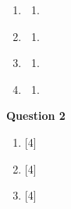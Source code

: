 \begin{enumerate}[label=(\roman*)]
    \item 

        \begin{multicols}{2}
        \begin{enumerate}[label=(\alph*)]
            \item 
        \end{enumerate}
        \end{multicols}

    \item 

        \begin{multicols}{2}
        \begin{enumerate}[label=(\alph*)]
            \item 
        \end{enumerate}
        \end{multicols}

    \item 

        \begin{multicols}{2}
        \begin{enumerate}[label=(\alph*)]
            \item 
        \end{enumerate}
        \end{multicols}

    \item 

        \begin{multicols}{2}
        \begin{enumerate}[label=(\alph*)]
            \item 
        \end{enumerate}
        \end{multicols}

\end{enumerate}

\par
\noindent
\textbf{Question 2}\\
\begin{enumerate}[label=(\roman*)]

    \item \hfill [4]

    \item \hfill [4]

    \item \hfill [4]

\end{enumerate}

